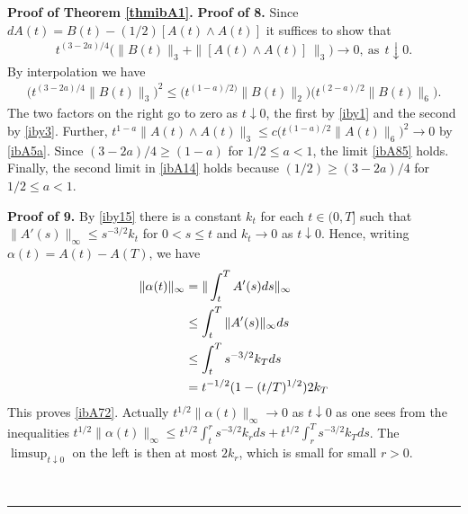 \documentclass[12pt]{article}
\newenvironment{proof}[1][Proof]{\textbf{#1.} }{\ \rule{0.5em}{0.5em}}
\def \({\Big(}
\def \){\Big)}
\def \eref{\eqref}
\numberwithin{equation}{section}
\begin{document}
\begin{proof}[Proof of Theorem \ref{thmibA1}]
 \bigskip
\noindent
{\bf Proof of 8.} 
 Since $dA(t) = B(t) -(1/2)[A(t)\wedge A(t)]$ it suffices to show that
 \begin{align}
 t^{(3-2a)/4} \( \|B(t)\|_3 + \| [ A(t)\wedge A(t)]\, \|_3\) \rightarrow 0, \ \text{as}\ \ t \downarrow 0. \label{ibA85}
 \end{align}
 By interpolation we have
 \begin{align*}
 \( t^{(3-2a)/4} \|B(t)\|_3\)^2 \le \Big(t^{(1-a)/2)} \|B(t)\|_2\Big) \Big(t^{(2-a)/2} \|B(t)\|_6\Big).
 \end{align*}
 The two factors on the right go  to zero as $t\downarrow 0$, 
 the first by \eref{iby1} and the second by \eref{iby3}. 
 Further,
 $t^{1-a} \|A(t)\wedge A(t)\|_3 \le c \Big(t^{(1-a)/2} \|A(t)\|_6\Big)^2 \rightarrow 0$ by \eref{ibA5a}.
 Since $(3-2a)/4 \ge (1-a)$ for $1/2 \le a <1$, the limit \eref{ibA85} holds. 
 Finally, the second limit in  \eref{ibA14}
 holds because $(1/2) \ge (3-2a)/4 $  for $1/2 \le a < 1$.  


 
\bigskip
\noindent 
{\bf Proof of 9.} 
By \eref{iby15} there is a constant $k_t$ for each $t \in (0, T]$ such that 
 $ \|A'(s)\|_\infty \le s^{-3/2}k_t$ for $0 < s \le t$ and $k_t \rightarrow 0$ as $t \downarrow 0$.
 Hence, writing $\alpha(t) = A(t) - A(T)$,  we have
\begin{align}
 \|\alpha(t)\|_\infty &= \| \int_t^T A'(s) ds \|_\infty                     \notag \\
 &\le \int_t^T \|A'(s)\|_\infty ds                                \notag \\
 & \le  \int_t^T s^{-3/2}k_T ds         \notag \\
 & = t^{-1/2}  (1- (t/T)^{1/2}) 2 k_T           \notag                        
 \end{align}
 This proves \eref{ibA72}. Actually $t^{1/2} \|\alpha(t)\|_\infty \rightarrow 0$ as $t\downarrow 0$
 as one sees from  the inequalities 
 $t^{1/2} \|\alpha(t)\|_\infty \le t^{1/2}\int_t^r s^{-3/2} k_r ds + t^{1/2} \int_r^T s^{-3/2} k_T ds$.
 The $\limsup_{t\downarrow 0}$ on the left is then at most $2 k_r$, which is small for small $r >0$.
 



\end{proof}
\end{document}
